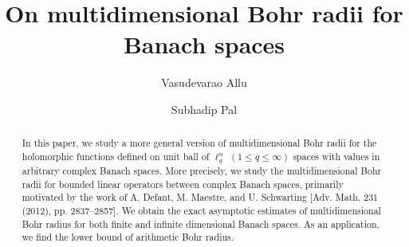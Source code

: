 \documentclass[a4paper,12pt]{amsart}
\theoremstyle{definition}
\newcounter{minutes}\setcounter{minutes}{\time}
\newcounter{hours}\setcounter{hours}{\time}
\begin{document}
\title{On multidimensional Bohr radii for Banach spaces}


\author{Vasudevarao Allu}
\address{Vasudevarao Allu,
Department of Mathematics,
School of Basic Sciences,
Indian Institute of Technology Bhubaneswar,
Bhubaneswar-752050, Odisha, India.}


\author{Subhadip Pal}
\address{Subhadip Pal,
	Department of Mathematics,
	School of Basic Sciences,
	Indian Institute of Technology Bhubaneswar,
	Bhubaneswar-752050, Odisha, India.}




\def\thefootnote{}
 \makeatletter\def\thefootnote{\@arabic\c@footnote}\makeatother



\begin{abstract}
In this paper, we study a more general version of multidimensional Bohr radii for the holomorphic functions defined on unit ball of $\ell^n_q\,\,(1\leq q\leq \infty)$ spaces with values in arbitrary complex Banach spaces. More precisely, we study the multidimensional Bohr radii for bounded linear operators between complex Banach spaces, primarily motivated by the work of A. Defant, M. Maestre, and U. Schwarting [Adv. Math. 231 (2012), pp. 2837--2857]. We obtain the exact asymptotic estimates of multidimensional Bohr radius for both finite and infinite dimensional Banach spaces. As an application, we find the lower bound of arithmetic Bohr radius.
\end{abstract}



\maketitle
\pagestyle{myheadings}
\end{document}
